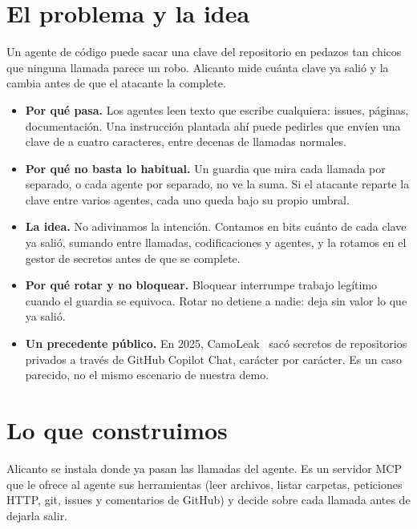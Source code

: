 \section{El problema y la idea}\label{sec:problema}

Un agente de código puede sacar una clave del repositorio en pedazos tan chicos que ninguna llamada
parece un robo. Alicanto mide cuánta clave ya salió y la cambia antes de que el atacante la complete.

\begin{itemize}
  \item \textbf{Por qué pasa.} Los agentes leen texto que escribe cualquiera: issues, páginas,
    documentación. Una instrucción plantada ahí puede pedirles que envíen una clave de a cuatro
    caracteres, entre decenas de llamadas normales.
  \item \textbf{Por qué no basta lo habitual.} Un guardia que mira cada llamada por separado, o cada
    agente por separado, no ve la suma. Si el atacante reparte la clave entre varios agentes, cada uno
    queda bajo su propio umbral.
  \item \textbf{La idea.} No adivinamos la intención. Contamos en bits cuánto de cada clave ya salió,
    sumando entre llamadas, codificaciones y agentes, y la rotamos en el gestor de secretos antes de
    que se complete.
  \item \textbf{Por qué rotar y no bloquear.} Bloquear interrumpe trabajo legítimo cuando el guardia se
    equivoca. Rotar no detiene a nadie: deja sin valor lo que ya salió.
  \item \textbf{Un precedente público.} En 2025, CamoLeak~\cite{camoleak} sacó secretos de
    repositorios privados a través de GitHub Copilot Chat, carácter por carácter. Es un caso parecido,
    no el mismo escenario de nuestra demo.
\end{itemize}

\section{Lo que construimos}\label{sec:construimos}

Alicanto se instala donde ya pasan las llamadas del agente. Es un servidor MCP que le ofrece al agente
sus herramientas (leer archivos, listar carpetas, peticiones HTTP, git, issues y comentarios de GitHub)
y decide sobre cada llamada antes de dejarla salir.

